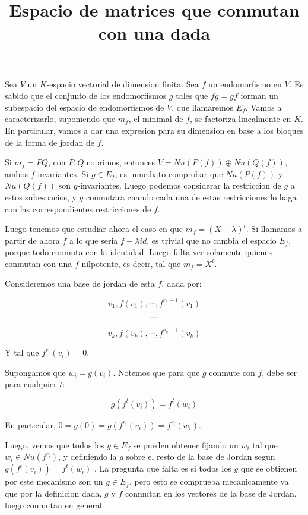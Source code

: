 \documentclass{article}
\title{Espacio de matrices que conmutan con una dada}
\author{}
\date{}
\begin{document}
\maketitle

Sea $V$ un $K$-espacio vectorial de dimension finita. Sea $f$ un endomorfismo en $V$. Es sabido que el conjunto
de los endomorfismos $g$ tales que $fg = gf$ forman un subespacio del espacio de endomorfismos de $V$, que llamaremos $E_f$. Vamos a
caracterizarlo, suponiendo que $m_f$, el minimal de $f$, se factoriza linealmente en $K$. En particular, vamos a dar una
expresion para su dimension en base a los bloques de la forma de jordan de $f$.

Si $m_f = PQ$, con $P,Q$ coprimos, entonces $V = Nu(P(f)) \oplus Nu(Q(f))$, ambos $f$-invariantes. Si $g \in E_f$, es inmediato comprobar que
$Nu(P(f))$ y $Nu(Q(f))$ son $g$-invariantes. Luego podemos considerar la restriccion de $g$ a estos subespacios, y $g$ conmutara cuando cada
una de estas restricciones lo haga con las correspondientes restricciones de $f$.

Luego tenemos que estudiar ahora el caso en que $m_f = (X-\lambda)^t$. Si llamamos a partir de ahora $f$ a lo que seria $f - \lambda id$,
es trivial que no cambia el espacio $E_f$, porque todo conmuta con la identidad. Luego falta ver solamente quienes conmutan con una $f$
nilpotente, es decir, tal que $m_f = X^t$.

Consideremos una base de jordan de esta $f$, dada por:

$$v_1, f(v_1), \cdots, f^{r_1 - 1}(v_1)$$

$$\cdots$$

$$v_k, f(v_k), \cdots, f^{r_k - 1}(v_k)$$

Y tal que $f^{r_i}(v_i) = 0$.

Supongamos que $w_i = g(v_i)$. Notemos que para que $g$ conmute con $f$, debe ser para cualquier $t$:

$$g(f^t(v_i)) = f^t(w_i)$$

En particular, $0 = g(0) = g(f^{r_i}(v_i)) = f^{r_i}(w_i)$.

Luego, vemos que todos los $g \in E_f$ se pueden obtener fijando un $w_i$ tal que $w_i \in Nu(f^{r_i})$, y
definiendo la $g$ sobre el resto de la base de Jordan segun $g(f^t(v_i)) = f^t(w_i)$ . La pregunta
que falta es si todos los $g$ que se obtienen por este mecanismo son un $g \in E_f$, pero esto se
comprueba mecanicamente ya que por la definicion dada, $g$ y $f$ conmutan en los vectores de la base de Jordan,
luego conmutan en general.
\end{document}
